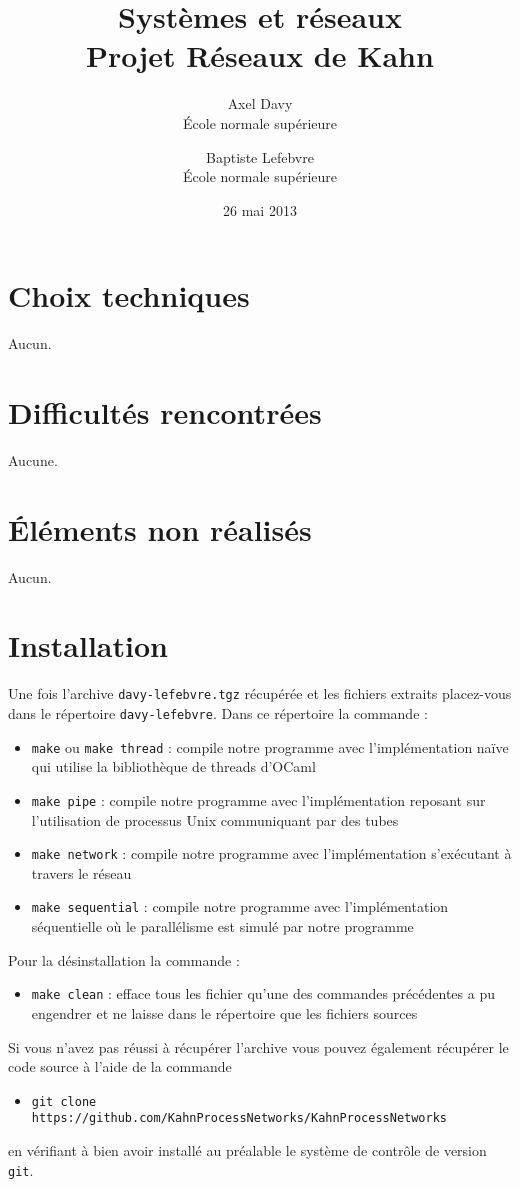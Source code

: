 \documentclass[a4paper]{article}
\begin{document}
	\title{\textbf{Systèmes et réseaux \\ Projet Réseaux de Kahn}}
	\author{Axel Davy \\ \'Ecole normale supérieure \and Baptiste Lefebvre \\ \'Ecole normale supérieure}
	\date{26 mai 2013}
	\maketitle


\section{Choix techniques}
Aucun.

\section{Difficultés rencontrées}
Aucune.

\section{\'Eléments non réalisés}
Aucun.

\section{Installation}

Une fois l'archive \texttt{davy-lefebvre.tgz} récupérée et les fichiers extraits placez-vous dans le répertoire \texttt{davy-lefebvre}. Dans ce répertoire la commande :
\begin{itemize}
	\item \texttt{make} ou \texttt{make thread} : compile notre programme avec l'implémentation naïve qui utilise la bibliothèque de threads d'OCaml
	\item \texttt{make pipe} : compile notre programme avec l'implémentation reposant sur l'utilisation de processus Unix communiquant par des tubes
	\item \texttt{make network} : compile notre programme avec l'implémentation s'exécutant à travers le réseau
	\item \texttt{make sequential} : compile notre programme avec l'implémentation séquentielle où le parallélisme est simulé par notre programme
\end{itemize}
Pour la désinstallation la commande :
\begin{itemize}
	\item \texttt{make clean} : efface tous les fichier qu'une des commandes précédentes a pu engendrer et ne laisse dans le répertoire que les fichiers sources
\end{itemize}
Si vous n'avez pas réussi à récupérer l'archive vous pouvez également récupérer le code source à l'aide de la commande
\begin{itemize}
	\item \texttt{git clone https://github.com/KahnProcessNetworks/KahnProcessNetworks}
\end{itemize}
en vérifiant à bien avoir installé au préalable le système de contrôle de version \texttt{git}.
 
\end{document}
